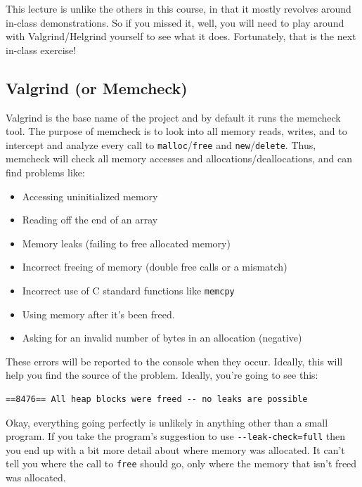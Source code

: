 \documentclass[a4paper]{report}
\begin{document}
This lecture is unlike the others in this course, in that it mostly revolves around in-class demonstrations. So if you missed it, well, you will need to play around with Valgrind/Helgrind yourself to see what it does. Fortunately, that is the next in-class exercise!

\subsection*{Valgrind (or Memcheck) }
Valgrind is the base name of the project and by default it runs the memcheck tool. The purpose of memcheck is to look into all memory reads, writes, and to intercept and analyze every call to \texttt{malloc}/\texttt{free} and \texttt{new}/\texttt{delete}. Thus, memcheck will check all memory accesses and allocations/deallocations, and can find problems like:
\begin{itemize}
	\item Accessing uninitialized memory
	\item Reading off the end of an array
	\item Memory leaks (failing to free allocated memory)
	\item Incorrect freeing of memory (double free calls or a mismatch)
	\item Incorrect use of C standard functions like \texttt{memcpy}
	\item Using memory after it's been freed.
	\item Asking for an invalid number of bytes in an allocation (negative\textinterrobang)
\end{itemize}

These errors will be reported to the console when they occur. Ideally, this will help you find the source of the problem. Ideally, you're going to see this:
\begin{verbatim}
==8476== All heap blocks were freed -- no leaks are possible
\end{verbatim}

Okay, everything going perfectly is unlikely in anything other than a small program.  If you take the program's suggestion to use \verb+--leak-check=full+ then you end up with a bit more detail about where memory was allocated. It can't tell you where the call to \texttt{free} should go, only where the memory that isn't freed was allocated.
\end{document}
